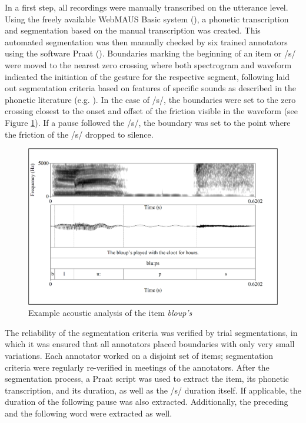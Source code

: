 In a first step, all recordings were manually transcribed on the utterance level. Using the freely available WebMAUS Basic system (\cite{Schiel1999, Kisler2017}), a phonetic transcription and segmentation based on the manual transcription was created. This automated segmentation was then manually checked by six trained annotators using the software Praat (\cite{Boersma2019}). Boundaries marking the beginning of an item or /s/ were moved to the nearest zero crossing where both spectrogram and waveform indicated the initiation of the gesture for the respective segment, following laid out segmentation criteria based on features of specific sounds as described in the phonetic literature (e.g. \cite{Ladefoged2003}). In the case of /s/, the boundaries were set to the zero crossing closest to the onset and offset of the friction visible in the waveform (see Figure \ref{fig:4_2}). If a pause followed the /s/, the boundary was set to the point where the friction of the /s/ dropped to silence. 

\begin{figure}
    \centering
    \includegraphics[width=1\textwidth]{figures/fig4.2.png}
    \caption{Example acoustic analysis of the item \textit{bloup’s}}
    \label{fig:4_2}
\end{figure}

The reliability of the segmentation criteria was verified by trial segmentations, in which it was ensured that all annotators placed boundaries with only very small variations. Each annotator worked on a disjoint set of items; segmentation criteria were regularly re-verified in meetings of the annotators. After the segmentation process, a Praat script was used to extract the item, its phonetic transcription, and its duration, as well as the /s/ duration itself. If applicable, the duration of the following pause was also extracted. Additionally, the preceding and the following word were extracted as well.


